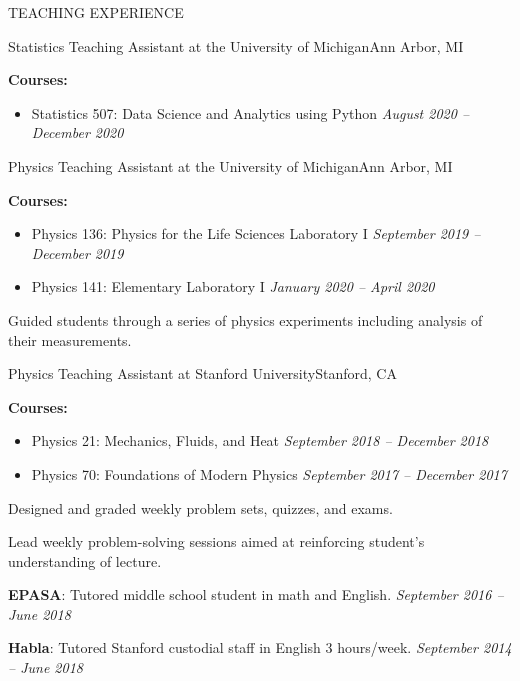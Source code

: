 \begin{rSection}{TEACHING EXPERIENCE} 
%
\begin{rSubsection}{Statistics Teaching Assistant at the University of Michigan}{Ann Arbor, MI}{}{}
\item \textbf{Courses:}
%
    \begin{itemize}[itemsep=-0.4em]
        \vspace*{-0.5em}
        \item Statistics 507: Data Science and Analytics using Python \hfill \textit{August 2020 -- December 2020}
    \end{itemize}
%
\end{rSubsection} 
%
\begin{rSubsection}{Physics Teaching Assistant at the University of Michigan}{Ann Arbor, MI}{}{}
\item \textbf{Courses:}
%
    \begin{itemize}[itemsep=-0.4em]
        \vspace*{-0.5em}
        \item Physics 136: Physics for the Life Sciences Laboratory I \hfill \textit{September 2019 -- December 2019}
        \item Physics 141: Elementary Laboratory I \hfill \textit{January 2020 -- April 2020}
    \end{itemize}
%
\item Guided students through a series of physics experiments including analysis of their measurements.
\end{rSubsection} 
%
\begin{rSubsection}{Physics Teaching Assistant at Stanford University}{Stanford, CA}{}{}
\item \textbf{Courses:}
%
    \begin{itemize}[itemsep=-0.5em]
        \vspace*{-0.5em}
        \item Physics 21: Mechanics, Fluids, and Heat \hfill \textit{September 2018 -- December 2018}
        \item Physics 70: Foundations of Modern Physics \hfill \textit{September 2017 -- December 2017}
    \end{itemize}
%
\item Designed and graded weekly problem sets, quizzes, and exams. 
\item Lead weekly problem-solving sessions aimed at reinforcing student's understanding of lecture. 
%
\end{rSubsection} 
%
\textbf{EPASA}: Tutored middle school student in math and English. \hfill {\em September 2016 -- June 2018}

\vspace*{-.15cm}
\textbf{Habla}: Tutored Stanford custodial staff in English 3 hours/week. \hfill {\em September 2014 -- June 2018}
\end{rSection}


